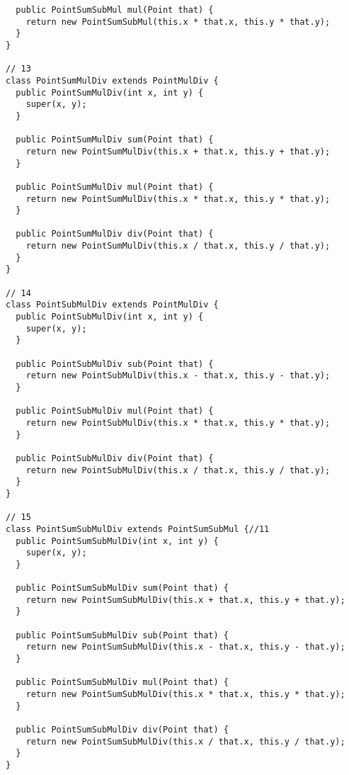 \begin{lstlisting}
  public PointSumSubMul mul(Point that) {
    return new PointSumSubMul(this.x * that.x, this.y * that.y);
  }
}

// 13
class PointSumMulDiv extends PointMulDiv {
  public PointSumMulDiv(int x, int y) {
    super(x, y);
  }

  public PointSumMulDiv sum(Point that) {
    return new PointSumMulDiv(this.x + that.x, this.y + that.y);
  }

  public PointSumMulDiv mul(Point that) {
    return new PointSumMulDiv(this.x * that.x, this.y * that.y);
  }

  public PointSumMulDiv div(Point that) {
    return new PointSumMulDiv(this.x / that.x, this.y / that.y);
  }
}

// 14
class PointSubMulDiv extends PointMulDiv {
  public PointSubMulDiv(int x, int y) {
    super(x, y);
  }

  public PointSubMulDiv sub(Point that) {
    return new PointSubMulDiv(this.x - that.x, this.y - that.y);
  }

  public PointSubMulDiv mul(Point that) {
    return new PointSubMulDiv(this.x * that.x, this.y * that.y);
  }

  public PointSubMulDiv div(Point that) {
    return new PointSubMulDiv(this.x / that.x, this.y / that.y);
  }
}

// 15
class PointSumSubMulDiv extends PointSumSubMul {//11
  public PointSumSubMulDiv(int x, int y) {
    super(x, y);
  }

  public PointSumSubMulDiv sum(Point that) {
    return new PointSumSubMulDiv(this.x + that.x, this.y + that.y);
  }

  public PointSumSubMulDiv sub(Point that) {
    return new PointSumSubMulDiv(this.x - that.x, this.y - that.y);
  }

  public PointSumSubMulDiv mul(Point that) {
    return new PointSumSubMulDiv(this.x * that.x, this.y * that.y);
  }

  public PointSumSubMulDiv div(Point that) {
    return new PointSumSubMulDiv(this.x / that.x, this.y / that.y);
  }
}
\end{lstlisting}
